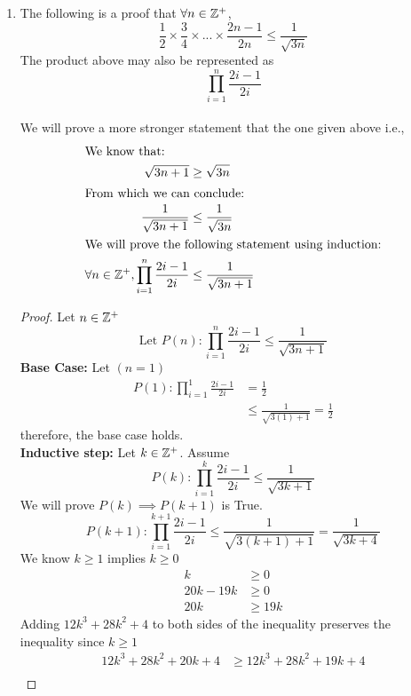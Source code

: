 \documentclass[12pt]{article}
\theoremstyle{definition}
\begin{document}
\begin{enumerate}
    \item The following is a proof that $\forall n \in \mathbb Z^{+}$, $$\frac{1}{2} \times \frac{3}{4} \times ... \times \frac{2n-1}{2n} \leq \frac{1}{\sqrt{3n}}$$
    The product above may also be represented as $$\prod_{i=1}^{n}\frac{2i-1}{2i}$$ \\
    We will prove a more stronger statement that the one given above i.e.,
        \begin{align*}
           \intertext{We know that: }
            \sqrt{3n+1} &\geq \sqrt{3n} \\ 
            \intertext{From which we can conclude:}
            \frac{1}{\sqrt{3n+1}} &\leq \frac{1}{\sqrt{3n}} \\
            \intertext{We will prove the following statement using induction:}
            \forall n \in \mathbb Z^{+}, \prod_{i=1}^{n}\frac{2i-1}{2i} &\leq \frac{1}{\sqrt{3n+1}} \\
        \end{align*}
    \begin{proof}
    Let $n \in \mathbb Z^{+}$
    \begin{equation*}
        \text{Let } P(n): \prod_{i=1}^{n}\frac{2i-1}{2i} \leq \frac{1}{\sqrt{3n+1}}
    \end{equation*}
        \textbf{Base Case: } Let $(n = 1)$
        \begin{align*}
            P(1): \prod_{i=1}^{1}\frac{2i-1}{2i} &= \frac{1}{2} \\ 
            &\leq \frac{1}{\sqrt{3(1)+1}} = \frac{1}{2}
        \end{align*}
        therefore, the base case holds. \\
        \textbf{Inductive step: } Let $k\in \mathbb Z^{+}$. Assume
        $$P(k): \prod_{i=1}^{k}\frac{2i-1}{2i} \leq \frac{1}{\sqrt{3k+1}}$$ 
        We will prove $P(k) \implies P(k+1)$ is True.
        $$P(k+1):
        \prod_{i=1}^{k+1}\frac{2i-1}{2i} \leq \frac{1}{\sqrt{3(k+1)+1}} = \frac{1}{\sqrt{3k+4}}$$ 
        We know $k \geq 1$ implies $k \geq 0$
        \begin{align*}
            k &\geq 0 \\ 
            20k - 19k &\geq 0 \\
            20k &\geq 19k
        \end{align*}
        Adding $12k^{3}+28k^{2}+4$ to both sides of the inequality preserves the inequality since $k \geq 1$ 
        \begin{align*}
            12k^{3}+28k^{2}+20k+4 &\geq  12k^{3}+28k^{2}+19k+4 \\ 

\end{align*}
\end{proof}
\end{enumerate}
\end{document}
